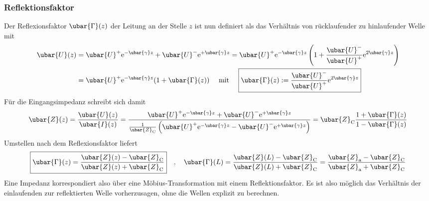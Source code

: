 \subsubsection{Reflektionsfaktor}
Der Reflexionsfaktor $\ubar{\Gamma}(z)$ der Leitung an der Stelle $z$ ist nun definiert als das Verhältnis von rücklaufender zu hinlaufender Welle mit
\begin{align}
	\ubar{U}(z) & =\ubar{U}^{+} \mathrm{e}^{-\ubar{\gamma} z}+\ubar{U}^{-} \mathrm{e}^{+\ubar{\gamma} z}=\ubar{U}^{+} \mathrm{e}^{-\ubar{\gamma} z}\left(1+\frac{\ubar{U}^{-}}{\ubar{U}^{+}} \mathrm{e}^{2 \ubar{\gamma} z}\right)  \\
	& =\ubar{U}^{+} \mathrm{e}^{-\ubar{\gamma} z}(1+\ubar{\Gamma}(z)) \quad \text { mit } \quad \boxed{\ubar{\Gamma}(z):=\frac{\ubar{U}^{-}}{\ubar{U}^{+}} \mathrm{e}^{2 \ubar{\gamma} z} }
\end{align}
Für die Eingangsimpedanz schreibt sich damit
\begin{equation}
	\ubar{Z}(z)=\frac{\ubar{U}(z)}{\ubar{I}(z)}=\frac{\ubar{U}^{+} \mathrm{e}^{-\ubar{\gamma} z}+\ubar{U}^{-} \mathrm{e}^{+\ubar{\gamma} z}}{\frac{1}{\ubar{Z}_{\mathrm{C}}}\left(\ubar{U}^{+} \mathrm{e}^{-\ubar{\gamma} z}-\ubar{U}^{-} \mathrm{e}^{+\ubar{\gamma} z}\right)}=\ubar{Z}_{\mathrm{C}} \frac{1+\ubar{\Gamma}(z)}{1-\ubar{\Gamma}(z)} 
\end{equation}
Umstellen nach dem Reflexionsfaktor liefert
\begin{equation}
	\boxed{\ubar{\Gamma}(z)=\frac{\ubar{Z}(z)-\ubar{Z}_{\mathrm{C}}}{\ubar{Z}(z)+\ubar{Z}_{\mathrm{C}}}} \quad, \quad \ubar{\Gamma}(L)=\frac{\ubar{Z}(L)-\ubar{Z}_{\mathrm{C}}}{\ubar{Z}(L)+\ubar{Z}_{\mathrm{C}}}=\frac{\ubar{Z}_{\mathrm{a}}-\ubar{Z}_{\mathrm{C}}}{\ubar{Z}_{\mathrm{a}}+\ubar{Z}_{\mathrm{C}}} 
\end{equation}
Eine Impedanz korrespondiert also über eine Möbius-Transformation mit einem Reflektionsfaktor. Es ist also möglich das Verhältnis der einlaufenden zur reflektierten Welle vorherzusagen, ohne die Wellen explizit zu berechnen.
